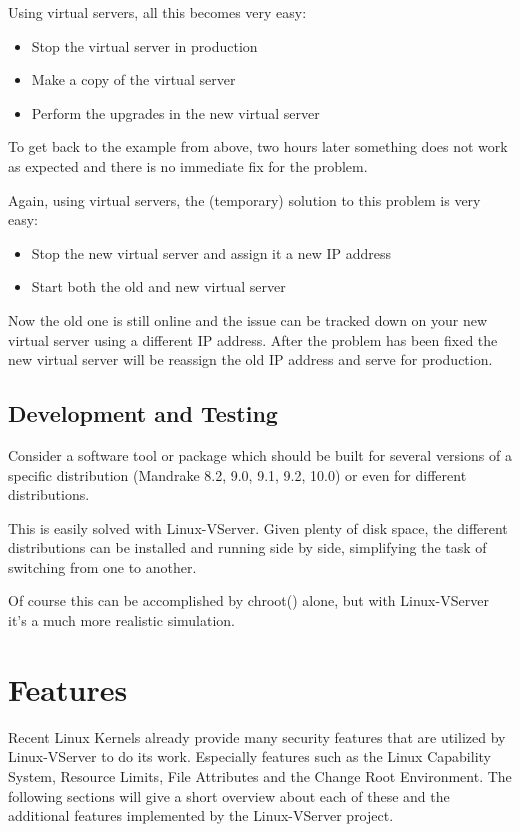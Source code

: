 Using virtual servers, all this becomes very easy:

\begin{itemize}
	\item Stop the virtual server in production
	\item Make a copy of the virtual server
	\item Perform the upgrades in the new virtual server
\end{itemize}

To get back to the example from above, two hours later something does not work
as expected and there is no immediate fix for the problem.

Again, using virtual servers, the (temporary) solution to this problem is very
easy:

\begin{itemize}
	\item Stop the new virtual server and assign it a new IP address
	\item Start both the old and new virtual server
\end{itemize}

Now the old one is still online and the issue can be tracked down on your new
virtual server using a different IP address. After the problem has been fixed
the new virtual server will be reassign the old IP address and serve for
production.


\subsection{Development and Testing}

Consider a software tool or package which should be built for several versions
of a specific distribution (Mandrake 8.2, 9.0, 9.1, 9.2, 10.0) or even for
different distributions.

This is easily solved with Linux-VServer. Given plenty of disk space, the
different distributions can be installed and running side by side, simplifying
the task of switching from one to another.

Of course this can be accomplished by chroot() alone, but with Linux-VServer
it's a much more realistic simulation.


\section{Features}

Recent Linux Kernels already provide many security features that are utilized
by Linux-VServer to do its work. Especially features such as the Linux
Capability System, Resource Limits, File Attributes and the Change Root
Environment. The following sections will give a short overview about each of
these and the additional features implemented by the Linux-VServer project.



